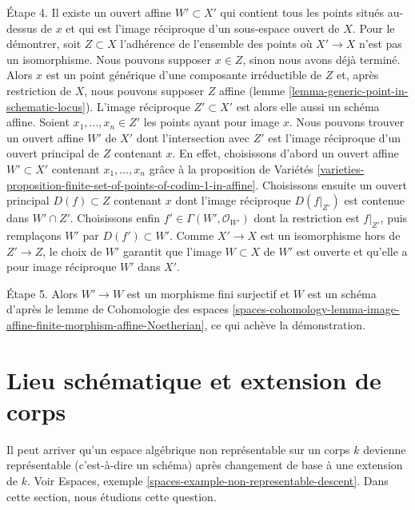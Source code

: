 \begin{remark}
\medskip\noindent
Étape 4. Il existe un ouvert affine $W' \subset X'$ qui contient tous les points
situés au-dessus de $x$ et qui est l'image réciproque d'un sous-espace ouvert de $X$.
Pour le démontrer, soit $Z \subset X$ l'adhérence de l'ensemble des points
où $X' \to X$ n'est pas un isomorphisme. Nous pouvons supposer $x \in Z$, sinon
nous avons déjà terminé. Alors $x$ est un point générique d'une composante
irréductible de $Z$ et, après restriction de $X$, nous pouvons supposer $Z$ affine
(lemme \ref{lemma-generic-point-in-schematic-locus}).
L'image réciproque $Z' \subset X'$ est alors elle aussi un schéma affine.
Soient $x_1, \ldots, x_n \in Z'$ les points ayant pour image $x$.
Nous pouvons trouver un ouvert affine $W'$ de $X'$ dont l'intersection avec
$Z'$ est l'image réciproque d'un ouvert principal de $Z$ contenant $x$.
En effet, choisissons d'abord un ouvert affine $W' \subset X'$ contenant
$x_1, \ldots, x_n$ grâce à la proposition de Variétés
\ref{varieties-proposition-finite-set-of-points-of-codim-1-in-affine}.
Choisissons ensuite un ouvert principal $D(f) \subset Z$ contenant $x$
dont l'image réciproque $D(f|_{Z'})$ est contenue dans $W' \cap Z'$.
Choisissons enfin $f' \in \Gamma(W', \mathcal{O}_{W'})$ dont la restriction
est $f|_{Z'}$, puis remplaçons $W'$ par $D(f') \subset W'$.
Comme $X' \to X$ est un isomorphisme hors de $Z' \to Z$, le choix
de $W'$ garantit que l'image $W \subset X$ de $W'$ est ouverte
et qu'elle a pour image réciproque $W'$ dans $X'$.

\medskip\noindent
Étape 5. Alors $W' \to W$ est un morphisme fini surjectif et $W$ est un schéma d'après le
lemme de Cohomologie des espaces
\ref{spaces-cohomology-lemma-image-affine-finite-morphism-affine-Noetherian},
ce qui achève la démonstration.
\end{remark}





\section{Lieu schématique et extension de corps}
\label{section-schematic-and-field-extension}

\noindent
Il peut arriver qu'un espace algébrique non représentable sur un corps $k$
devienne représentable (c'est-à-dire un schéma) après changement de base à une extension
de $k$. Voir Espaces, exemple \ref{spaces-example-non-representable-descent}.
Dans cette section, nous étudions cette question.

